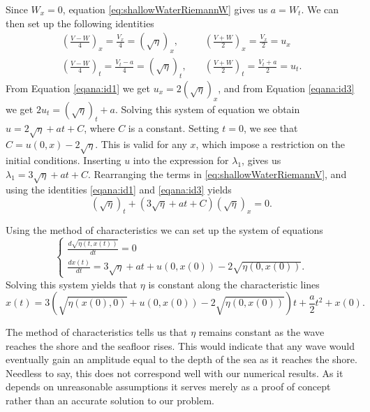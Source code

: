 \documentclass[11pt]{article}
\begin{document}
Since $W_x = 0$, equation \eqref{eq:shallowWaterRiemannW} gives us $a = W_t$. We can then set up  the following identities
\begin{align}
\left(\frac{V-W}{4}\right)_x = \frac{V_x}{4} = \left( \sqrt{\eta}\right)_x,& \quad
\left(\frac{V+W}{2}\right)_x = \frac{V_x}{2} = u_x \label{eqana:id1}\\ 
\left(\frac{V-W}{4}\right)_t = \frac{V_t - a}{4} = \left( \sqrt{\eta}\right)_t,  &\quad \left(\frac{V+W}{2}\right)_t = \frac{V_t + a}{2} = u_t.
\label{eqana:id3}
\end{align}
From Equation \eqref{eqana:id1} we get $u_x = 2\left( \sqrt{\eta}\right)_x$, and from Equation \eqref{eqana:id3} we get $2u_t  =\left( \sqrt{\eta}\right)_t + a$. Solving this system of equation we obtain $u = 2\sqrt{\eta}+at+ C$, where $C$ is a constant. Setting $t=0$, we see that $C = u(0,x)-2\sqrt{\eta}$. This is valid for any $x$, which impose a restriction on the initial conditions. Inserting $u$ into the expression for $\lambda_1$, gives us $\lambda_1 = 3 \sqrt{\eta} + at+C$. Rearranging the terms in \eqref{eq:shallowWaterRiemannV}, and using the identities \eqref{eqana:id1} and \eqref{eqana:id3} yields
\begin{equation}
	\left(\sqrt{\eta}\right)_t + \left( 3 \sqrt{\eta} + at + C \right) \left(\sqrt{\eta}\right)_x = 0.
\end{equation}



Using the method of characteristics we can set up the system of equations 
\begin{equation*}
\label{blablabla}
\begin{cases}
\frac{d \sqrt{\eta(t,x(t))}}{dt} = 0\\
\frac{d x(t)}{d t} = 3 \sqrt{\eta} + at + u(0,x(0)) - 2\sqrt{\eta (0,x(0))} .
\end{cases}
\end{equation*}
Solving this system yields that $\eta$ is constant along the characteristic lines
\begin{equation}
	x(t) = 3 \left(\sqrt{\eta\left(x(0),0\right)}+ u(0,x(0)) - 2\sqrt{\eta (0,x(0))} \right)t + \frac{a}{2}t^2 + x(0).
\end{equation}

The method of characteristics tells us that $\eta$ remains constant as the wave reaches the shore and the seafloor rises. This would indicate that any wave would eventually gain an amplitude equal to the depth of the sea as it reaches the shore. Needless to say, this does not correspond well with our numerical results. As it depends on unreasonable assumptions it serves merely as a proof of concept rather than an accurate solution to our problem.
\end{document}
